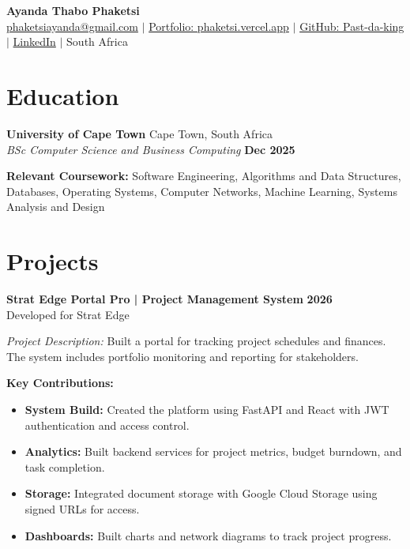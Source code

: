 \documentclass[a4paper,10pt]{article}
\begin{document}
\pagestyle{empty} %

\begin{center}
    {\LARGE \textbf{Ayanda Thabo Phaketsi}} \\[4pt]
    \small
    \href{mailto:phaketsiayanda@gmail.com}{phaketsiayanda@gmail.com} $|$ 
    \href{https://phaketsi.vercel.app}{Portfolio: phaketsi.vercel.app} $|$ 
    \href{https://github.com/Past-da-king}{GitHub: Past-da-king} $|$ 
    \href{https://www.linkedin.com/in/ayanda-phakesti-747877248/}{LinkedIn} $|$ 
    South Africa
\end{center}

\vspace{4pt}

\section*{Education}

\textbf{University of Cape Town} \hfill Cape Town, South Africa \\
\textit{BSc Computer Science and Business Computing} \hfill \textbf{Dec 2025}

\vspace{4pt}
\textbf{Relevant Coursework:} Software Engineering, Algorithms and Data Structures, Databases, Operating Systems, Computer Networks, Machine Learning, Systems Analysis and Design

\vspace{8pt}

\section*{Projects}
\textbf{Strat Edge Portal Pro | Project Management System} \hfill \textbf{2026}\\
\small{Developed for Strat Edge}

\textit{Project Description:} 
Built a portal for tracking project schedules and finances. The system includes portfolio monitoring and reporting for stakeholders.

\textbf{Key Contributions:}
\begin{itemize}
    \item \textbf{System Build:} Created the platform using FastAPI and React with JWT authentication and access control.
    \item \textbf{Analytics:} Built backend services for project metrics, budget burndown, and task completion.
    \item \textbf{Storage:} Integrated document storage with Google Cloud Storage using signed URLs for access.
    \item \textbf{Dashboards:} Built charts and network diagrams to track project progress.
\end{itemize}
\end{document}

